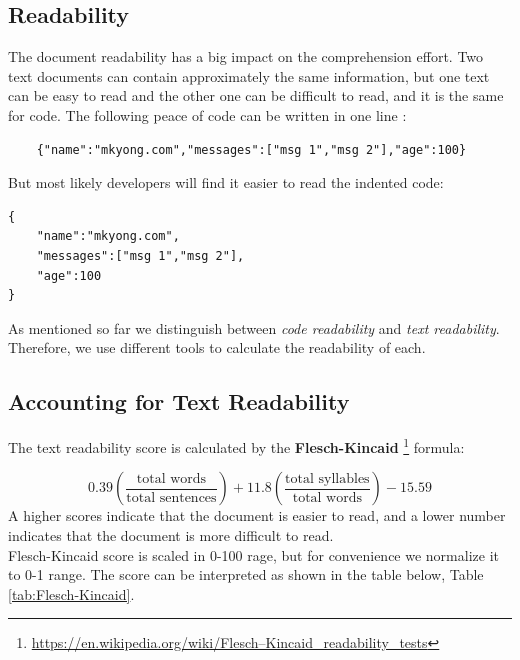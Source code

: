\documentclass[12pt,mscthesis]{usiinfthesis}
\begin{document}
	\subsection{Readability} 
		The document readability has a big impact on the comprehension effort. Two text documents can contain approximately the same information, but one text can be easy to read and the other one can be difficult to read, and it is the same for code. The following peace of code can be written in one line :

		\begin{lstlisting}
	{"name":"mkyong.com","messages":["msg 1","msg 2"],"age":100}

		\end{lstlisting}	
	But most likely developers will find it easier to read the indented code:\\

	 	\begin{lstlisting}
{
	"name":"mkyong.com",
	"messages":["msg 1","msg 2"],
	"age":100
}
	\end{lstlisting}
 
	As mentioned so far we distinguish between \emph{code readability} and \emph{text readability}. Therefore, we use different tools to calculate the readability of each. 

\subsection{Accounting for Text Readability}
	The text readability score is calculated by the \textbf{Flesch-Kincaid} \footnote{\url{https://en.wikipedia.org/wiki/Flesch–Kincaid_readability_tests}} formula:
	

	\[0.39\left({\frac  {{\mbox{total words}}}{{\mbox{total sentences}}}}\right)+11.8\left({\frac  {{\mbox{total syllables}}}{{\mbox{total words}}}}\right)-15.59\]
	A higher scores indicate that the document is easier to read, and a lower number indicates that the document is more difficult to read.\\ 
	Flesch-Kincaid score is scaled in 0-100 rage, but for convenience we normalize it to 0-1 range. The score can be interpreted as shown in the table below, Table \ref{tab:Flesch-Kincaid}.
	
\end{document}
